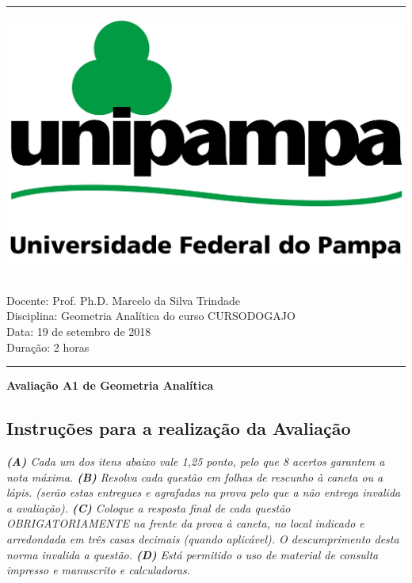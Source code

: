 \pagestyle{empty}
	
\hrule
\begin{multicols}{2}
   \hspace{-4cm}
	\includegraphics[width=\linewidth/2]{logo.jpg}%
		{\centering
		
		 \\
		\hspace{-5cm}Docente:            Prof. Ph.D. Marcelo da Silva Trindade\\
		\hspace{-5cm}Disciplina:         Geometria Analítica do curso CURSODOGAJO             \\
		\hspace{-5cm}Data: 19 de setembro de 2018                \\
		\hspace{-5cm}Duração:            2 horas         \\
	    }
	
	
\end{multicols}
	
	\hrule
	
	\begin{center}
	
	 	\vspace{2pt} 	
		
		\Large \textbf{Avaliação A1 de Geometria Analítica}
		
	\end{center}
	
	
\begin{snugshade}
	\section*{Instruções para a realização da Avaliação}
\end{snugshade}
{\it 
	{\bf (A)} Cada um dos itens abaixo vale 1,25 ponto, pelo que 8 acertos garantem a nota máxima. {\bf (B)} Resolva cada questão em folhas de rescunho à caneta ou a lápis. (serão estas entregues e agrafadas na prova pelo que a não entrega invalida a avaliação). {\bf (C)} Coloque a resposta final de cada questão OBRIGATORIAMENTE na frente da prova à caneta, no local indicado e arredondada em três casas decimais (quando aplicável). O descumprimento desta norma invalida a questão. {\bf (D)} Está permitido o uso de material de consulta impresso e manuscrito e calculadoras.}

